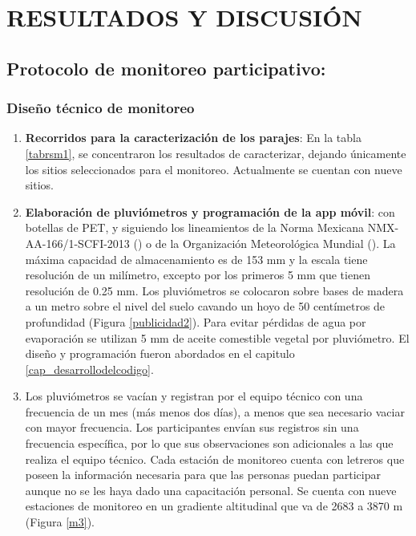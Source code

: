 \chapter{RESULTADOS Y DISCUSIÓN}
 
\section{Protocolo de monitoreo participativo:} 
 
\subsection{Diseño técnico de monitoreo}
 

\begin{enumerate}
  \item \textbf{Recorridos para la caracterización de los parajes}: En la tabla \ref{tabrsm1}, se concentraron los resultados de caracterizar, dejando únicamente los sitios seleccionados para el monitoreo. Actualmente se cuentan con nueve sitios.
    \item \textbf{Elaboración de pluviómetros y programación de la app móvil}: con botellas de PET, y siguiendo los lineamientos de la Norma Mexicana NMX-AA-166/1-SCFI-2013 (\cite{se2013}) o de la Organización Meteorológica Mundial (\cite{WMO2014}). La máxima capacidad de almacenamiento es de 153 mm y la escala tiene resolución de un milímetro, excepto por los primeros 5 mm que tienen resolución de 0.25 mm. Los pluviómetros se colocaron sobre bases de madera a un metro sobre el nivel del suelo cavando un hoyo de 50 centímetros de profundidad (Figura \ref{publicidad2}). Para evitar pérdidas de agua por evaporación se utilizan 5 mm de aceite comestible vegetal por pluviómetro. El diseño y programación fueron abordados en el capitulo \ref{cap_desarrollodelcodigo}.

    \item Los pluviómetros se vacían y registran por el equipo técnico con una frecuencia de un mes (más menos dos días), a menos que sea necesario vaciar con mayor frecuencia. Los participantes envían sus registros sin una frecuencia específica, por lo que sus observaciones son adicionales a las que realiza el equipo técnico. Cada estación de monitoreo cuenta con letreros que poseen la información necesaria para que las personas puedan participar aunque no se les haya dado una capacitación personal. Se cuenta con nueve estaciones de monitoreo en un gradiente altitudinal que va de 2683 a 3870 m (Figura \ref{m3}). 
\end{enumerate}
